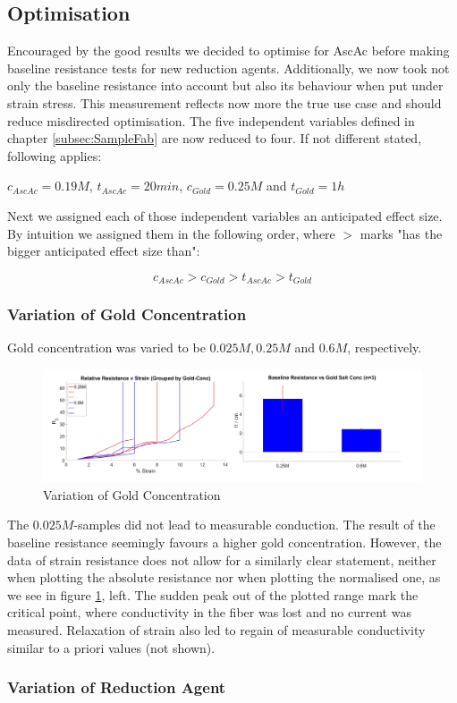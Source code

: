 \subsection{Optimisation}
Encouraged by the good results we decided to optimise for AscAc before making baseline resistance tests for new reduction agents. Additionally, we now took not only the baseline resistance into account but also its behaviour when put under strain stress. This measurement reflects now more the true use case and should reduce misdirected optimisation. The five independent variables defined in chapter \ref{subsec:SampleFab} are now reduced to four. If not different stated, following applies: \begin{center}$c_{AscAc}=0.19M$, $t_{AscAc}=20min$, $c_{Gold}=0.25M$ and $t_{Gold}=1h$
\end{center}
Next we assigned each of those independent variables an anticipated effect size. By intuition we assigned them in the following order, where $>$ marks "has the bigger anticipated effect size than":

\begin{equation}
    c_{AscAc} > c_{Gold} > t_{AscAc} > t_{Gold}
\end{equation}

\subsubsection{Variation of Gold Concentration}

Gold concentration was varied to be $0.025M, 0.25M$  and $0.6M$, respectively.

\begin{figure}[H]
    \centerline{\includegraphics[scale=0.7]{./pic/R0vGoldConc.PNG}}
    \caption{Variation of Gold Concentration}
    \label{fig:GoldConc}
\end{figure}

The $0.025M$-samples did not lead to measurable conduction. The result of the baseline resistance seemingly favours a higher gold concentration. However, the data of strain resistance does not allow for a similarly clear statement, neither when plotting the absolute resistance nor when plotting the normalised one, as we see in figure \ref{fig:GoldConc}, left. The sudden peak out of the plotted range mark the critical point, where conductivity in the fiber was lost and no current was measured. Relaxation of strain also led to regain of measurable conductivity similar to a priori values (not shown).

\subsubsection{Variation of Reduction Agent}

